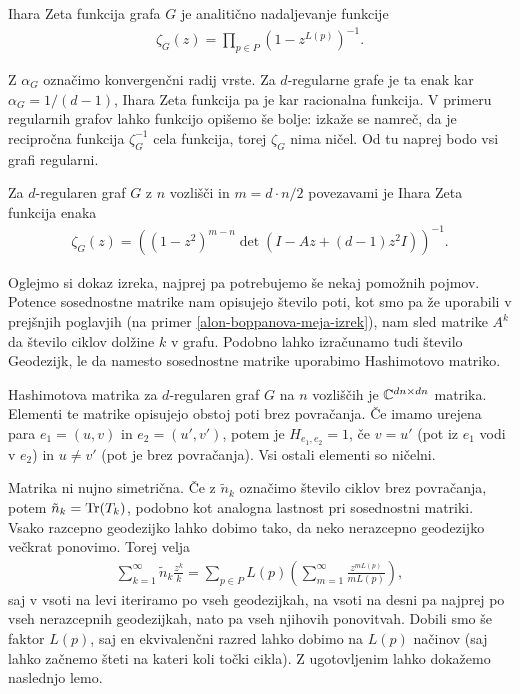 \begin{definicija}
    Ihara Zeta funkcija grafa \(G\) je analitično nadaljevanje funkcije
    \begin{align*}
        \zeta_G(z) = \prod_{p\in P}\left(1-z^{L(p)}\right)^{-1}.
    \end{align*}
\end{definicija}
 
Z \(\alpha_G\) označimo konvergenčni radij vrste. Za \(d\)-regularne grafe je ta enak kar \(\alpha_G = 1/(d-1)\), Ihara Zeta funkcija pa je kar racionalna funkcija. V primeru regularnih grafov lahko funkcijo opišemo še bolje: izkaže se namreč, da je recipročna funkcija \(\zeta_G^{-1}\) cela funkcija, torej \(\zeta_G\) nima ničel. Od tu naprej bodo vsi grafi regularni.

\begin{izrek}\label{zeta-je-racionalna-bass}
    Za \(d\)-regularen graf \(G\) z \(n\) vozlišči in \(m=d\cdot n / 2\) povezavami je Ihara Zeta funkcija enaka
    \begin{align*}
        \zeta_G(z) = \left((1-z^2)^{m-n}\det(I-Az+(d-1)z^2I)\right)^{-1}.
    \end{align*}
\end{izrek}
Oglejmo si dokaz izreka\cite{rangarajan:LIPIcs.FSTTCS.2017.46}, najprej pa potrebujemo še nekaj pomožnih pojmov. Potence sosednostne matrike nam opisujejo število poti, kot smo pa že uporabili v prejšnjih poglavjih (na primer \ref{alon-boppanova-meja-izrek}), nam sled matrike \(A^k\) da število ciklov dolžine \(k\) v grafu. Podobno lahko izračunamo tudi število Geodezijk, le da namesto sosednostne matrike uporabimo Hashimotovo matriko.
\begin{definicija}
    Hashimotova matrika za \(d\)-regularen graf \(G\) na \(n\) vozliščih je \(\mathbb C^{dn\times dn}\) matrika. Elementi te matrike opisujejo obstoj poti brez povračanja. Če imamo urejena para \(e_1 = (u, v)\) in \(e_2= (u', v')\), potem je \(H_{e_1, e_2}=1\), če \(v = u'\) (pot iz \(e_1\) vodi v \(e_2\)) in \(u\neq v'\) (pot je brez povračanja). Vsi ostali elementi so ničelni.
\end{definicija}
Matrika ni nujno simetrična. Če z \(\tilde{n}_k\) označimo število ciklov brez povračanja, potem \(\tilde{n}_k = \operatorname{Tr}(T_k)\), podobno kot analogna lastnost pri sosednostni matriki. Vsako razcepno geodezijko lahko dobimo tako, da neko nerazcepno geodezijko večkrat ponovimo. Torej velja
\begin{align}\label{enakost-l-tilden}
    \sum_{k=1}^\infty \tilde{n}_k \frac{z^k}{k} = \sum_{p\in P} L(p)\left(\sum_{m=1}^\infty \frac{z^{mL(p)}}{mL(p)}\right),
\end{align}
saj v vsoti na levi iteriramo po vseh geodezijkah, na vsoti na desni pa najprej po vseh nerazcepnih geodezijkah, nato pa vseh njihovih ponovitvah. Dobili smo še faktor \(L(p)\), saj en ekvivalenčni razred lahko dobimo na \(L(p)\) načinov (saj lahko začnemo šteti na kateri koli točki cikla). Z ugotovljenim lahko dokažemo naslednjo lemo.

